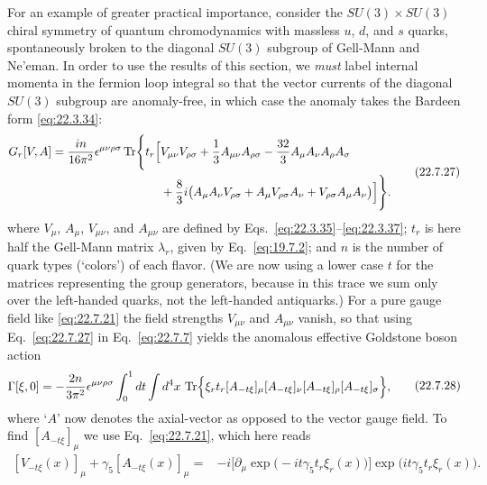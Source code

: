 For an example of greater practical importance, consider the
$SU(3)\times SU(3)$ chiral symmetry of quantum chromodynamics with massless
$u$, $d$, and $s$ quarks, spontaneously broken to the diagonal $SU(3)$
subgroup of Gell-Mann and Ne'eman. In order to use the results of this
section, we \emph{must} label internal momenta in the fermion loop integral
so that the vector currents of the diagonal $SU(3)$ subgroup are
anomaly-free, in which case the anomaly takes the Bardeen form
\eqref{eq:22.3.34}:
\begin{equation}
 \begin{aligned}
 G_r[V,A]
 =\frac{in}{16\pi^2}\epsilon^{\mu\nu\rho\sigma}
 \operatorname{Tr}\Biggl\{t_r\Bigl[
 &V_{\mu\nu}V_{\rho\sigma}
 +\frac{1}{3}A_{\mu\nu}A_{\rho\sigma}
 -\frac{32}{3}A_\mu A_\nu A_\rho A_\sigma
 \\
 &+\frac{8}{3}i\bigl(
 A_\mu A_\nu V_{\rho\sigma}
 +A_\mu V_{\rho\sigma}A_\nu
 +V_{\rho\sigma}A_\mu A_\nu
 \bigr)\Bigr]\Biggr\}.
 \end{aligned}
 \tag{22.7.27}\label{eq:22.7.27}
\end{equation}
where $V_\mu$, $A_\mu$, $V_{\mu\nu}$, and $A_{\mu\nu}$ are defined by
Eqs.~\eqref{eq:22.3.35}--\eqref{eq:22.3.37}; $t_r$ is here half the
Gell-Mann matrix $\lambda_r$, given by Eq.~\eqref{eq:19.7.2}; and $n$ is
the number of quark types (`colors') of each flavor. (We are now using a
lower case $t$ for the matrices representing the group generators,
because in this trace we sum only over the left-handed quarks, not the
left-handed antiquarks.) For a pure gauge field like \eqref{eq:22.7.21}
the field strengths $V_{\mu\nu}$ and $A_{\mu\nu}$ vanish, so that using
Eq.~\eqref{eq:22.7.27} in Eq.~\eqref{eq:22.7.7} yields the anomalous
effective Goldstone boson action
\begin{equation}
 \begin{aligned}
 \Gamma[\xi,0]
 =-\frac{2n}{3\pi^2}\epsilon^{\mu\nu\rho\sigma}
 \int_0^1dt\int d^4x\,
 \operatorname{Tr}\Bigl\{
 \xi_rt_r[A_{-t\xi}]_\mu[A_{-t\xi}]_\nu
 [A_{-t\xi}]_\rho[A_{-t\xi}]_\sigma
 \Bigr\},
 \end{aligned}
 \tag{22.7.28}\label{eq:22.7.28}
\end{equation}
where `$A$' now denotes the axial-vector as opposed to the vector gauge
field. To find $[A_{-t\xi}]_\mu$ we use Eq.~\eqref{eq:22.7.21}, which
here reads
\begin{equation}
 \begin{aligned}
 [V_{-t\xi}(x)]_\mu+\gamma_5[A_{-t\xi}(x)]_\mu
 ={}&-i\bigl[\partial_\mu
 \exp\bigl(-it\gamma_5t_r\xi_r(x)\bigr)\bigr]
 \exp\bigl(it\gamma_5t_r\xi_r(x)\bigr).
 \end{aligned}
 \tag{22.7.29}\label{eq:22.7.29}
\end{equation}
